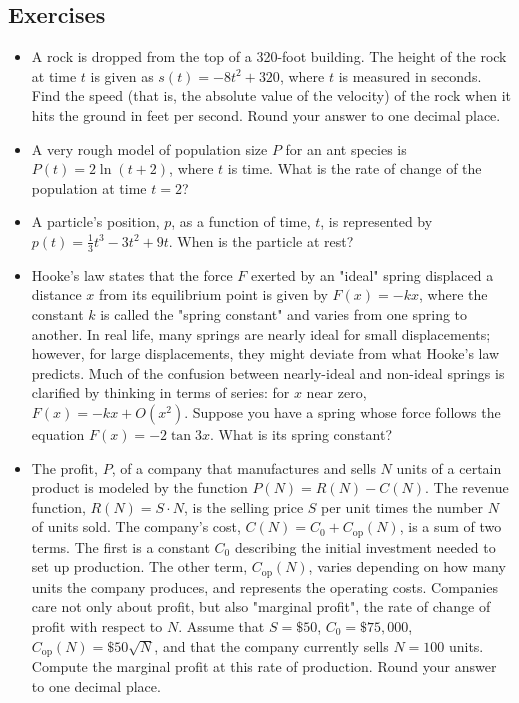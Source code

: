 \documentclass[twoside,openright,titlepage,a4paper]{book}
\begin{document}
\begin{sloppypar}
\subsection{Exercises}
\begin{itemize}
\item A rock is dropped from the top of a 320-foot building. The height of the rock at time $t$ is given as $s(t)=-8t^2+320$, where $t$ is measured in seconds. Find the speed (that is, the absolute value of the velocity) of the rock when it hits the ground in feet per second. Round your answer to one decimal place.
\item A very rough model of population size $P$ for an ant species is $P(t) = 2\ln(t+2)$, where $t$ is time. What is the rate of change of the population at time $t = 2$?
\item A particle's position, $p$, as a function of time, $t$, is represented by $\displaystyle p(t) = \frac{1}{3}t^3 - 3t^2 + 9t$. When is the particle at rest?
\item Hooke's law states that the force $F$ exerted by an "ideal" spring displaced a distance $x$ from its equilibrium point is given by $F(x) = -kx$, where the constant $k$ is called the "spring constant" and varies from one spring to another. In real life, many springs are nearly ideal for small displacements; however, for large displacements, they might deviate from what Hooke's law predicts. Much of the confusion between nearly-ideal and non-ideal springs is clarified by thinking in terms of series: for $x$ near zero, $F(x) = -kx + O(x^2)$. Suppose you have a spring whose force follows the equation $F(x) = - 2 \tan 3x$. What is its spring constant?
\item The profit, $P$, of a company that manufactures and sells $N$ units of a certain product is modeled by the function $ P(N) = R(N) - C(N) $. The revenue function, $R(N)=S\cdot N$, is the selling price $S$ per unit times the number $N$ of units sold. The company's cost, $C(N)=C_0+C_\mathrm{op}(N)$, is a sum of two terms. The first is a constant $C_0$ describing the initial investment needed to set up production. The other term, $C_\mathrm{op}(N)$, varies depending on how many units the company produces, and represents the operating costs. Companies care not only about profit, but also "marginal profit", the rate of change of profit with respect to $N$. Assume that $S = \$50$, $C_0 = \$75,000$, $C_\mathrm{op}(N) = \$50 \sqrt{N}$, and that the company currently sells $N=100$ units. Compute the marginal profit at this rate of production. Round your answer to one decimal place.

\end{itemize}
\end{sloppypar}
\end{document}
